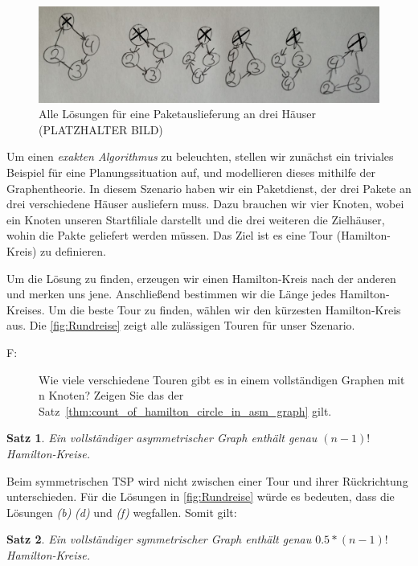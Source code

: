 \documentclass{article}
\newtheorem{mysat}{Satz}
\begin{document}
\begin{figure}[H]
	\centering
	\includegraphics[width=1\textwidth]{Graphen.png}
	\caption{Alle Lösungen für eine Paketauslieferung an drei Häuser (PLATZHALTER BILD)}
	\label{fig:Rundreise}
\end{figure}

Um einen \textit{exakten Algorithmus} zu beleuchten, stellen wir zunächst ein triviales Beispiel für eine Planungssituation auf, und modellieren dieses mithilfe der Graphentheorie. In diesem Szenario haben wir ein Paketdienst, der drei Pakete an drei verschiedene Häuser ausliefern muss. Dazu brauchen wir vier Knoten, wobei ein Knoten unseren Startfiliale darstellt und die drei weiteren die Zielhäuser, wohin die Pakte geliefert werden müssen. Das Ziel ist es eine Tour (Hamilton-Kreis) zu definieren.
\par Um die Lösung zu finden, erzeugen wir einen Hamilton-Kreis nach der anderen und merken uns jene. Anschließend bestimmen wir die Länge jedes Hamilton-Kreises. Um die beste Tour zu finden, wählen wir den kürzesten Hamilton-Kreis aus. Die \autoref{fig:Rundreise} zeigt alle zulässigen Touren für unser Szenario.

\begin{description}
	\item[F:] Wie viele verschiedene Touren gibt es in einem vollständigen Graphen mit n Knoten? Zeigen Sie das der Satz~\autoref{thm:count_of_hamilton_circle_in_asm_graph} gilt.
\end{description}

\begin{mysat}\label{thm:count_of_hamilton_circle_in_asm_graph}
	Ein vollständiger asymmetrischer Graph enthält genau $(n-1)!$ Hamilton-Kreise.
\end{mysat}

Beim symmetrischen TSP wird nicht zwischen einer Tour und ihrer Rückrichtung unterschieden. Für die Lösungen in \autoref{fig:Rundreise} würde es bedeuten, dass die Lösungen \textit{(b)} \textit{(d)} und \textit{(f)} wegfallen. Somit gilt:

\begin{mysat}
	Ein vollständiger symmetrischer Graph enthält genau $0.5 * (n-1)!$ Hamilton-Kreise.
\end{mysat}
\end{document}
